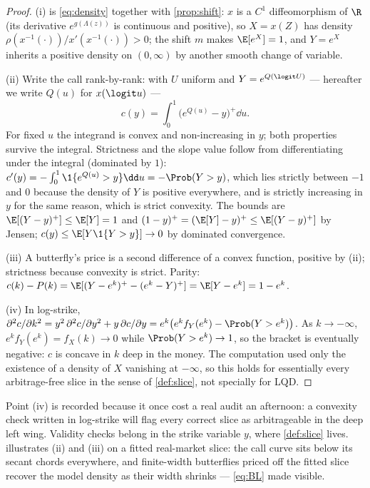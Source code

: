 \begin{proof}
(i) is \eqref{eq:density} together with \cref{prop:shift}: $x$ is a
$C^1$ diffeomorphism of $\R$ (its derivative $e^{g(\Lambda(z))}$ is
continuous and positive), so $X=x(Z)$ has density
$\rho(x^{-1}(\cdot))/x'(x^{-1}(\cdot))>0$; the shift $m$ makes
$\E[e^{X}]=1$, and $Y=e^{X}$ inherits a positive density on $(0,\infty)$
by another smooth change of variable.

(ii) Write the call rank-by-rank: with $U$ uniform and $Y=e^{Q(\logit U)}$
--- hereafter we write $Q(u)$ for $x(\logit u)$ ---
\[
c(y)=\int_0^1\big(e^{Q(u)}-y\big)^{+}\dd u .
\]
For fixed $u$ the integrand is convex and non-increasing in $y$; both
properties survive the integral.  Strictness and the slope value follow
from differentiating under the integral (dominated by $1$):
$c'(y)=-\int_0^1\1\{e^{Q(u)}>y\}\dd u=-\Prob(Y>y)$, which lies strictly
between $-1$ and $0$ because the density of $Y$ is positive everywhere,
and is strictly increasing in $y$ for the same reason, which is strict
convexity.  The bounds are $\E[(Y-y)^{+}]\le\E[Y]=1$ and
$(1-y)^{+}=(\E[Y]-y)^{+}\le\E[(Y-y)^{+}]$ by Jensen; $c(y)\le
\E[Y\1\{Y>y\}]\to0$ by dominated convergence.

(iii) A butterfly's price is a second difference of a convex function,
positive by (ii); strictness because convexity is strict.  Parity:
$c(k)-P(k)=\E[(Y-e^{k})^{+}-(e^{k}-Y)^{+}]=\E[Y-e^{k}]=1-e^{k}$.

(iv) In log-strike, $\partial^2 c/\partial k^2
=y^2\,\partial^2c/\partial y^2+y\,\partial c/\partial y
=e^{k}\big(e^{k}f_Y(e^{k})-\Prob(Y>e^{k})\big)$.  As $k\to-\infty$,
$e^{k}f_Y(e^{k})=f_X(k)\to0$ while $\Prob(Y>e^{k})\to1$, so the bracket is
eventually negative: $c$ is concave in $k$ deep in the money.  The
computation used only the existence of a density of $X$ vanishing at
$-\infty$, so this holds for essentially every arbitrage-free slice in the
sense of \cref{def:slice}, not specially for LQD.
\end{proof}

Point (iv) is recorded because it once cost a real audit an afternoon: a
convexity check written in log-strike will flag every correct slice as
arbitrageable in the deep left wing.  Validity checks belong in the strike
variable $y$, where \cref{def:slice} lives.  
illustrates (ii) and (iii) on a fitted real-market slice: the call curve
sits below its secant chords everywhere, and finite-width butterflies
priced off the fitted slice recover the model density as their width
shrinks --- \eqref{eq:BL} made visible.

